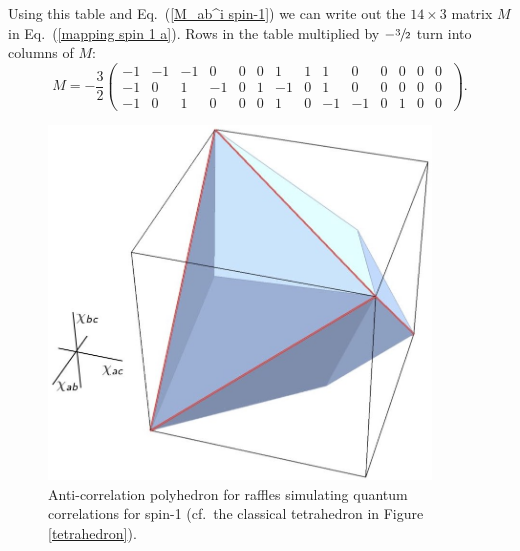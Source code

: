 Using this table and Eq.\ (\ref{M_ab^i spin-1}) we can write out the $14 \times 3$ matrix $M$ in Eq.\ (\ref{mapping spin 1 a}). Rows in the table multiplied by $-\sfrac32$ turn into columns of $M$:
\setcounter{MaxMatrixCols}{14}
\begin{equation}
M = -\frac32
\begin{pmatrix}
-1 & -1 & -1 & 0 & 0 & 0 & 1 & 1 & 1 & 0 & 0 & 0 & 0 & 0 \; \\[.2cm]
-1 & 0 & 1 & -1 & 0 & 1 & -1 & 0 & 1 & 0 & 0 & 0 & 0 & 0 \; \\[.2cm]
-1 & 0 & 1 & 0 & 0 & 0 & 1 & 0 & -1 & -1 & 0 & 1 & 0 & 0 \;
\end{pmatrix}.
\label{components of M spin 1}
\end{equation}

\begin{figure}[h]
 \centering
   \includegraphics[width=4in]{polytope-spin1.jpeg} 
   \caption{Anti-correlation polyhedron for raffles simulating quantum correlations for spin-1 (cf.\ the classical tetrahedron in Figure \ref{tetrahedron}).}
   \label{polytope-spin1}
\end{figure}

